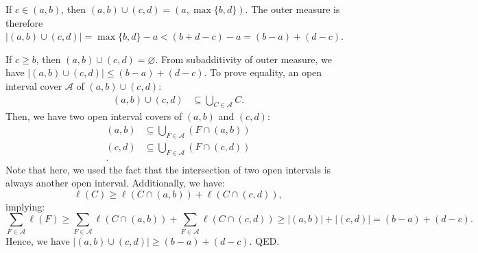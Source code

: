 \begin{enumerate}[label=\textbf{2A.\arabic*}]
    If \( c \in (a, b) \), then \( (a, b) \cup (c, d) = \left( a, \max \{b,
    d\}   \right)  \). The outer measure is therefore \( |(a, b) \cup (c, d)| =
    \max \{b, d\}  - a < (b + d - c) - a = (b - a) + (d - c) \).
    
    If \( c \ge b \), then \( (a, b) \cup (c, d) =\varnothing \). From
    subadditivity of outer measure, we have \( |(a, b) \cup (c, d)| \le (b - a)
    + (d - c)\). To prove equality, an open interval cover \( \mathcal{A} \) of \( (a,
    b) \cup  (c, d) \):
    \begin{align*}
      (a, b) \cup (c, d) &\subseteq \bigcup_{C \in \mathcal{A}} C
    .\end{align*}
    Then, we have two open interval covers of \( (a, b) \) and \( (c, d) \):
    \begin{align*}
      (a, b) &\subseteq \bigcup_{F \in \mathcal{A}} (F \cap (a, b))\\
      (c, d) &\subseteq \bigcup_{F \in \mathcal{A}} (F \cap (c, d))\\
    .\end{align*}
    Note that here, we used the fact that the intersection of two open intervals
    is always another open interval. Additionally, we have:
    \[
      \ell(C) \ge  \ell(C \cap (a, b)) + \ell(C \cap (c, d))
    ,\] implying:
    \[
      \sum_{F \in \mathcal{A}} \ell(F) \ge 
      \sum_{F \in \mathcal{A}} \ell(C\cap (a, b)) +
      \sum_{F \in \mathcal{A}} \ell(C\cap (c, d))
      \ge |(a, b)| + |(c, d)| = (b - a) + (d - c)
    .\] 
    Hence, we have \( |(a, b) \cup  (c, d)| \ge  (b - a) + (d - c) \). QED.


\end{enumerate}
